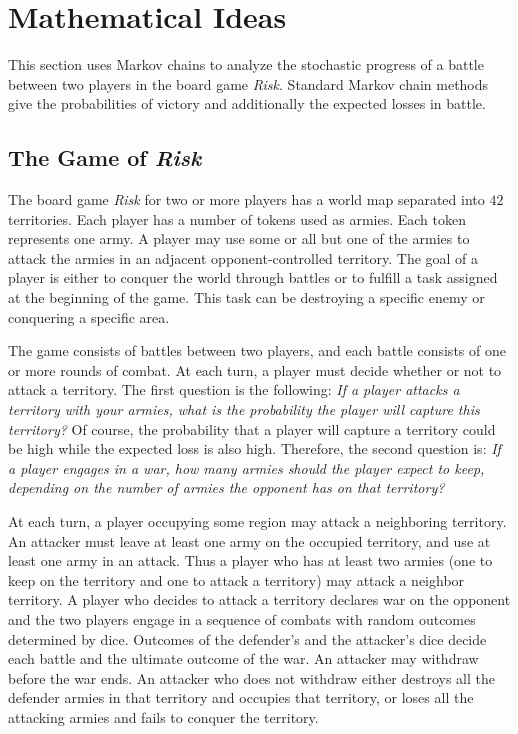 \documentclass[12pt]{article}
\begin{document}
\section*{Mathematical Ideas}

This section uses Markov chains to analyze the stochastic progress of a
battle between two players in the board game \emph{Risk}.  Standard
Markov chain methods give the probabilities of victory and additionally
the expected losses in battle.

\subsection*{The Game of \emph{Risk}}

The board game \emph{Risk} for two or more players has a world map
separated into \( 42 \) territories.  Each player has a number of tokens
used as armies.  Each token represents one army.  A player may use some
or all but one of the armies to attack the armies in an adjacent
opponent-controlled territory.  The goal of a player is either to
conquer the world through battles or to fulfill a task assigned at the
beginning of the game.  This task can be destroying a specific enemy or
conquering a specific area.%

The game consists of battles between two players, and each battle
consists of one or more rounds of combat.  At each turn, a player must
decide whether or not to attack a territory.  The first question is the
following:  \emph{If a player attacks a territory with your armies, what
is the probability the player will capture this territory?} Of course,
the probability that a player will capture a territory could be high
while the expected loss is also high.  Therefore, the second question
is: \emph{If a player engages in a war, how many armies should the
player expect to keep, depending on the number of armies the opponent
has on that territory?}

At each turn, a player occupying some region may attack a neighboring
territory.  An attacker must leave at least one army on the occupied
territory, and use at least one army in an attack.  Thus a player who
has at least two armies (one to keep on the territory and one to attack
a territory) may attack a neighbor territory.  A player who decides to
attack a territory declares war on the opponent and the two players
engage in a sequence of combats with random outcomes determined by dice.
Outcomes of the defender's and the attacker's dice decide each battle
and the ultimate outcome of the war.  An attacker may withdraw before
the war ends.  An attacker who does not withdraw either destroys all the
defender armies in that territory and occupies that territory, or loses
all the attacking armies and fails to conquer the territory.
\end{document}
